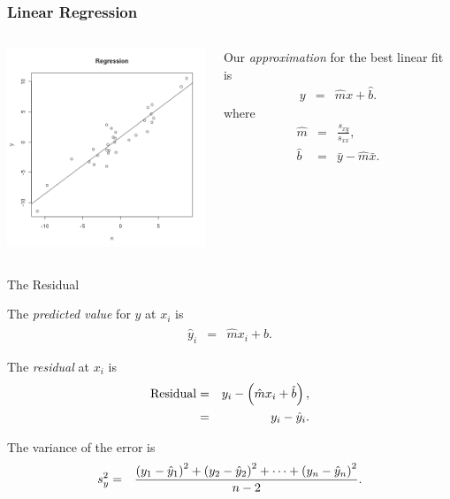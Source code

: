 \begin{frame}
  \frametitle{Linear Regression}

    \begin{columns}

      \centerline{\includegraphics[width=6cm]{img/regressionGeneral}}

      
      Our \textit{approximation} for the best linear fit is
      \begin{eqnarray*}
        y & = & \hat{m} x + \hat{b}.
      \end{eqnarray*}
      where
      \begin{eqnarray*}
        \hat{m} & = & \frac{s_{xy}}{s_{xx}}, \\
        \hat{b} & = & \bar{y} - \hat{m} \bar{x}.
      \end{eqnarray*}

    \end{columns}

\end{frame}


\begin{frame}{The Residual}

  \begin{definition}
    The \textit{\color{red} predicted value} for $y$ at $x_i$ is
    \begin{eqnarray*}
      \hat{y}_i & = & \hat{m} x_i + \hat{b}.
    \end{eqnarray*}

    The \textit{\color{red} residual} at $x_i$ is 
    \begin{eqnarray*}
      \mathrm{Residual} & = & y_i - \left( \hat{m} x_i + \hat{b} \right), \\
      & = & y_i - \hat{y}_i.
    \end{eqnarray*}

  \end{definition}

  {

    \begin{definition}
      The variance of the error is 
      \begin{eqnarray*}
        s^2_y & = & \frac{\left( y_1 - \hat{y}_1\right)^2 + \left( y_2 - \hat{y}_2\right)^2 + \cdots + \left( y_n - \hat{y}_n\right)^2 }{n-2}.
      \end{eqnarray*}
    \end{definition}

  }
  
\end{frame}

